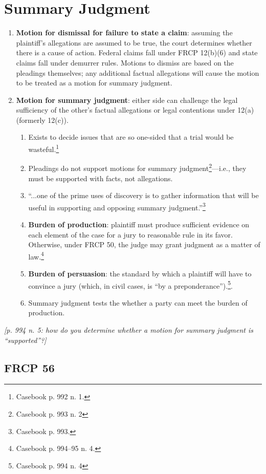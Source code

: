 \section{Summary Judgment}

\begin{enumerate}
    \item \textbf{Motion for dismissal for failure to state a claim}: assuming the plaintiff's allegations are assumed to be true, the court determines whether there is a cause of action. Federal claims fall under FRCP 12(b)(6) and state claims fall under demurrer rules. Motions to dismiss are based on the pleadings themselves; any additional factual allegations will cause the motion to be treated as a motion for summary judgment.
    \item \textbf{Motion for summary judgment}: either side can challenge the legal sufficiency of the other's factual allegations or legal contentions under 12(a) (formerly 12(c)).
    \begin{enumerate}
        \item Exists to decide issues that are so one-sided that a trial would be wasteful.\footnote{Casebook p. 992 n. 1.}
        \item Pleadings do not support motions for summary judgment\footnote{Casebook p. 993 n. 2}---i.e., they must be supported with facts, not allegations.
        \item ``...one of the prime uses of discovery is to gather information that will be useful in supporting and opposing summary judgment.''\footnote{Casebook p. 993.}
        \item \textbf{Burden of production}: plaintiff must produce sufficient evidence on each element of the case for a jury to reasonable rule in its favor. Otherwise, under FRCP 50, the judge may grant judgment as a matter of law.\footnote{Casebook p. 994--95 n. 4.}
        \item \textbf{Burden of persuasion}: the standard by which a plaintiff will have to convince a jury (which, in civil cases, is ``by a preponderance'').\footnote{Casebook p. 994 n. 4}.
        \item Summary judgment tests the whether a party can meet the burden of production.
    \end{enumerate}
\end{enumerate}

\emph{[p. 994 n. 5: how do you determine whether a motion for summary judgment is ``supported''?]}

\subsection{FRCP 56}

